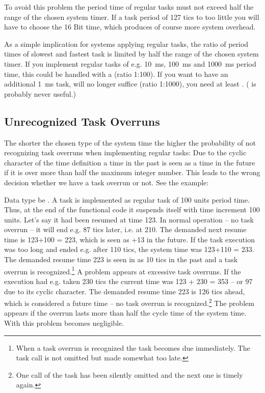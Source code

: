 To avoid this problem the period time of regular tasks must not exceed
half the range of the chosen system timer. If a task period of 127 tics to
too little you will have to choose the 16 Bit time, which produces of
course more system overhead.

As a simple implication for systems applying regular tasks, the ratio of
period times of slowest and fastest task is limited by half the range of
the chosen system timer. If you implement regular tasks of e.g. 10~ms,
100~ms and 1000~ms period time, this could be handled with a
 (ratio 1:100). If you want to have an additional 1~ms
task,  will no longer suffice (ratio 1:1000), you need at
least . ( is probably never useful.)


\subsection{Unrecognized Task Overruns}

The shorter the chosen type of the system time the higher the probability
of not recognizing task overruns when implementing regular tasks: Due to
the cyclic character of the time definition a time in the past is seen as
a time in the future if it is over more than half the maximum integer
number. This leads to the wrong decision whether we have a task overrun or
not. See the example:

Data type be . A task is implemented as regular task of
100 units period time. Thus, at the end of the functional code it suspends
itself with time increment 100 units. Let's say it had been resumed at
time 123. In normal operation -- no task overrun -- it will end e.g. 87
tics later, i.e. at 210. The demanded next resume time is 123+100 = 223,
which is seen as +13 in the future. If the task execution was too long and
ended e.g. after 110 tics, the system time was 123+110 = 233. The demanded
resume time 223 is seen in as 10 tics in the past and a task overrun is
recognized.\footnote{When a task overrun is recognized the task becomes
due immediately. The task call is not omitted but made somewhat too late.}
A problem appears at excessive task overruns. If the execution had e.g.
taken 230 tics the current time was 123 + 230 = 353 -- or 97 due to its
cyclic character. The demanded resume time 223 is 126 tics ahead, which is
considered a future time -- no task overrun is recognized.\footnote{One
call of the task has been silently omitted and the next one is timely
again.} The problem appears if the overrun lasts more than half the cycle
time of the system time. With  this problem becomes
negligible.


